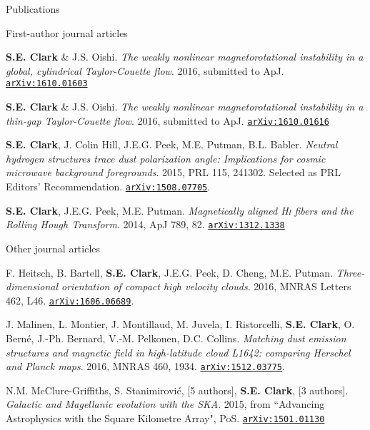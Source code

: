 \documentclass{resume_clark} %
\begin{document}
\begin{rSection}{Publications}

First-author journal articles

\begin{etaremune}

\item {\bf S.E. Clark} \& J.S. Oishi. \textit{The weakly nonlinear magnetorotational instability in a global, cylindrical Taylor-Couette flow}. 2016, submitted to ApJ. \href{https://arxiv.org/abs/1610.01603}{\tt arXiv:1610.01603}

\item {\bf S.E. Clark} \& J.S. Oishi. \textit{The weakly nonlinear magnetorotational instability in a thin-gap Taylor-Couette flow}. 2016, submitted to ApJ. \href{http://arxiv.org/abs/1610.01616}{\tt arXiv:1610.01616}

\item {\bf S.E. Clark}, J. Colin Hill, J.E.G. Peek, M.E. Putman, B.L. Babler. \textit{Neutral hydrogen structures trace dust polarization angle: Implications for cosmic microwave background foregrounds}. 2015, PRL 115, 241302. Selected as PRL Editors' Recommendation. \href{http://arxiv.org/abs/1508.07005}{\tt arXiv:1508.07705}. 

\item {\bf S.E. Clark}, J.E.G. Peek, M.E. Putman. {\em Magnetically aligned {\textit{\textsc{Hi}}} fibers and the Rolling Hough Transform}. 2014, {ApJ 789, 82}. \href{http://arxiv.org/abs/1312.1338}{\tt arXiv:1312.1338}
\end{etaremune}

Other journal articles

\begin{etaremune}
\item F. Heitsch, B. Bartell, {\bf S.E. Clark}, J.E.G. Peek, D. Cheng, M.E. Putman. \textit{Three-dimensional orientation of compact high velocity clouds}. 2016, MNRAS Letters 462, L46. \href{http://arxiv.org/abs/1606.06689}{\tt arXiv:1606.06689}.

\item J. Malinen, L. Montier, J. Montillaud, M. Juvela, I. Ristorcelli, {\bf S.E. Clark}, O. Bern\'e, J.-Ph. Bernard, V.-M. Pelkonen, D.C. Collins. \textit{Matching dust emission structures and magnetic field in high-latitude cloud L1642: comparing Herschel and Planck maps}. 2016, MNRAS 460, 1934. \href{http://arxiv.org/abs/1512.03775}{\tt arXiv:1512.03775}. 

\item N.M. McClure-Griffiths, S. Stanimirovi\' c, [5 authors], {\bf S.E. Clark}, [3 authors]. \textit{Galactic and Magellanic evolution with the SKA}. 2015, from ``Advancing Astrophysics with the Square Kilometre Array", PoS. \href{http://arxiv.org/abs/1501.01130}{\tt arXiv:1501.01130}


\end{etaremune}
\end{rSection}
\end{document}

